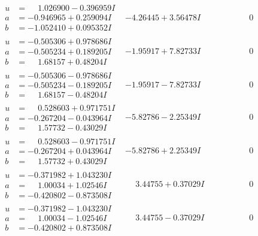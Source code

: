 \documentclass[1p]{elsarticle_modified}
\theoremstyle{definition}
\begin{document}
$$\begin{array}{c|c|c}
\begin{aligned}
u &= \phantom{-}1.026900 - 0.396959 I \\
a &= -0.946965 + 0.259094 I \\
b &= -1.052410 + 0.095352 I\end{aligned}
 & -4.26445 + 3.56478 I & \phantom{-0.000000 } 0 \\ \hline\begin{aligned}
u &= -0.505306 + 0.978686 I \\
a &= -0.505234 + 0.189205 I \\
b &= \phantom{-}1.68157 + 0.48204 I\end{aligned}
 & -1.95917 + 7.82733 I & \phantom{-0.000000 } 0 \\ \hline\begin{aligned}
u &= -0.505306 - 0.978686 I \\
a &= -0.505234 - 0.189205 I \\
b &= \phantom{-}1.68157 - 0.48204 I\end{aligned}
 & -1.95917 - 7.82733 I & \phantom{-0.000000 } 0 \\ \hline\begin{aligned}
u &= \phantom{-}0.528603 + 0.971751 I \\
a &= -0.267204 - 0.043964 I \\
b &= \phantom{-}1.57732 - 0.43029 I\end{aligned}
 & -5.82786 - 2.25349 I & \phantom{-0.000000 } 0 \\ \hline\begin{aligned}
u &= \phantom{-}0.528603 - 0.971751 I \\
a &= -0.267204 + 0.043964 I \\
b &= \phantom{-}1.57732 + 0.43029 I\end{aligned}
 & -5.82786 + 2.25349 I & \phantom{-0.000000 } 0 \\ \hline\begin{aligned}
u &= -0.371982 + 1.043230 I \\
a &= \phantom{-}1.00034 + 1.02546 I \\
b &= -0.420802 - 0.873508 I\end{aligned}
 & \phantom{-}3.44755 + 0.37029 I & \phantom{-0.000000 } 0 \\ \hline\begin{aligned}
u &= -0.371982 - 1.043230 I \\
a &= \phantom{-}1.00034 - 1.02546 I \\
b &= -0.420802 + 0.873508 I\end{aligned}
 & \phantom{-}3.44755 - 0.37029 I & \phantom{-0.000000 } 0 \\ \hline\begin{aligned}

\end{aligned}
\end{array}$$
\end{document}
